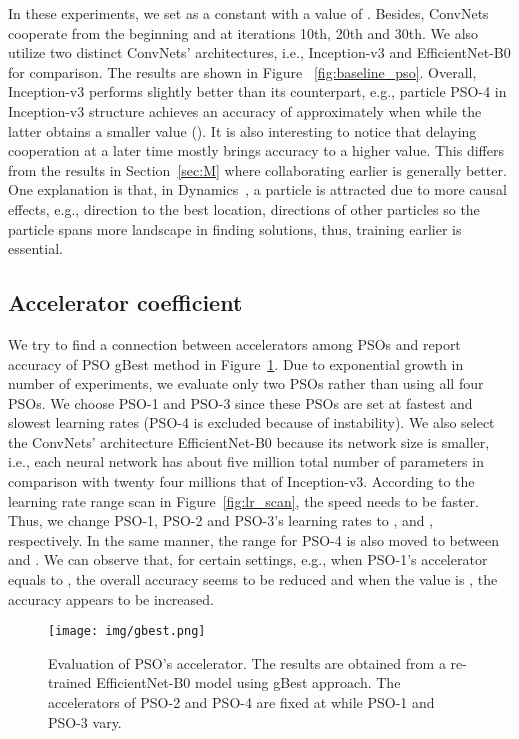 \documentclass{ieeeaccess}
\begin{document}
In these experiments, we set  as a constant with a value of . Besides, ConvNets cooperate from the beginning and at iterations 10th, 20th and 30th. We also utilize two distinct ConvNets' architectures, i.e., Inception-v3 and EfficientNet-B0 for comparison. The results are shown in Figure ~\ref{fig:baseline_pso}. Overall, Inception-v3 performs slightly better than its counterpart, e.g., particle PSO-4 in Inception-v3 structure achieves an accuracy of approximately  when  while the latter obtains a smaller value (). It is also interesting to notice that delaying cooperation at a later time mostly brings accuracy to a higher value. This differs from the results in Section~\ref{sec:M} where collaborating earlier is generally better. One explanation is that, in Dynamics~, a particle is attracted due to more causal effects, e.g., direction to the best location, directions of other particles so the particle spans more landscape in finding solutions, thus, training earlier is essential.
\subsection{Accelerator coefficient}
We try to find a connection between accelerators  among PSOs and report accuracy of PSO gBest method in Figure~\ref{fig:gbest}. Due to exponential growth in number of experiments, we evaluate only two PSOs rather than using all four PSOs. We choose PSO-1 and PSO-3 since these PSOs are set at fastest and slowest learning rates (PSO-4 is excluded because of instability). We also select the ConvNets' architecture EfficientNet-B0 because its network size is smaller, i.e., each neural network has about five million total number of parameters in comparison with twenty four millions that of Inception-v3. According to the learning rate range scan in Figure~\ref{fig:lr_scan}, the speed needs to be faster. Thus, we change  PSO-1, PSO-2 and PSO-3's learning rates to ,  and , respectively. In the same manner, the range for PSO-4 is also moved to between  and . We can observe that, for certain settings, e.g., when PSO-1's accelerator equals to , the overall accuracy seems to be reduced and when the value is , the accuracy appears to be increased.
\begin{figure}[hbt!]
\begin{center}
\texttt{[image: img/gbest.png]}
\caption{Evaluation of PSO's accelerator. The results are obtained from a re-trained EfficientNet-B0 model using gBest approach. The accelerators of PSO-2 and PSO-4 are fixed at  while PSO-1 and PSO-3 vary.}
\label{fig:gbest}
\end{center}
\end{figure}
\end{document}
